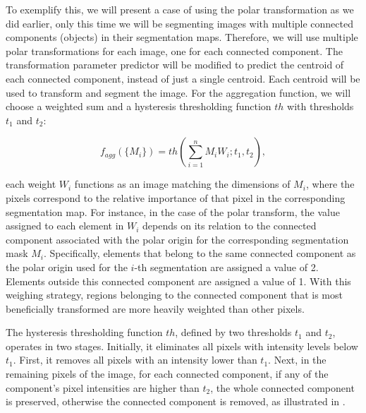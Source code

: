 To exemplify this, we will present a case of using the polar transformation as we did earlier, only this time we will be segmenting images with multiple connected components (objects) in their segmentation maps. Therefore, we will use multiple polar transformations for each image, one for each connected component. The transformation parameter predictor will be modified to predict the centroid of each connected component, instead of just a single centroid. Each centroid will be used to transform and segment the image. For the aggregation function, we will choose a weighted sum and a hysteresis thresholding function $th$ with thresholds $t_1$ and $t_2$:

\begin{equation}
	f_{agg}(\{M_i\}) = th(\sum_{i = 1}^n M_i W_i; t_1, t_2),
\end{equation}

each weight \(W_i\) functions as an image matching the dimensions of \(M_i\), where the pixels correspond to the relative importance of that pixel in the corresponding segmentation map. For instance, in the case of the polar transform, the value assigned to each element in \(W_i\) depends on its relation to the connected component associated with the polar origin for the corresponding segmentation mask \(M_i\). Specifically, elements that belong to the same connected component as the polar origin used for the \(i\)-th segmentation are assigned a value of 2. Elements outside this connected component are assigned a value of 1. With this weighing strategy, regions belonging to the connected component that is most beneficially transformed are more heavily weighted than other pixels.

The hysteresis thresholding function \(th\), defined by two thresholds \(t_1\) and \(t_2\), operates in two stages. Initially, it eliminates all pixels with intensity levels below \(t_1\). First, it removes all pixels with an intensity lower than $t_1$. Next, in the remaining pixels of the image, for each connected component, if any of the component's pixel intensities are higher than $t_2$, the whole connected component is preserved, otherwise the connected component is removed, as illustrated in .

